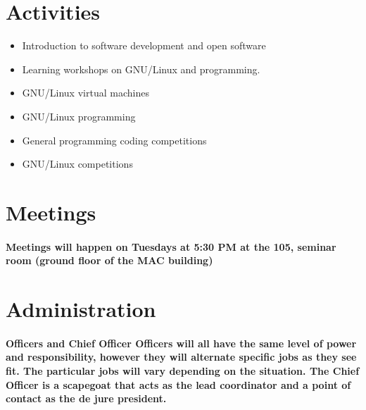 \documentclass[a4paper, 11pt]{amsart}
\begin{document}
\section{Activities}
\begin{itemize}
    \item Introduction to software development and open software
  \item Learning workshops on GNU/Linux and programming.
  \item GNU/Linux virtual machines
  \item GNU/Linux programming
  \item General programming coding competitions
  \item GNU/Linux competitions
\end{itemize}




\section{Meetings}
\paragraph{Meetings will happen on Tuesdays at 5:30 PM at the 105, seminar room (ground floor of the MAC building)}




\section{Administration}
\paragraph{Officers and Chief Officer
    Officers will all have the same level of power and responsibility, however they will alternate specific jobs as they see fit. The particular jobs will vary depending on the situation.
    The Chief Officer is a scapegoat that acts as the lead coordinator and a point of contact as the de jure president.
}
\end{document}
